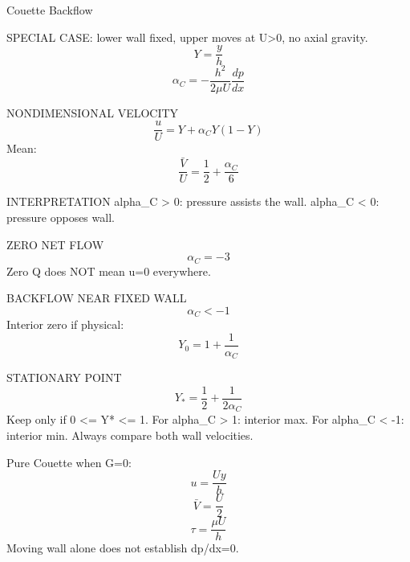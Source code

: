 Couette Backflow

SPECIAL CASE: lower wall fixed, upper moves at U>0, no axial gravity.
$$Y=\frac{y}{h}$$
$$\alpha_C=-\frac{h^2}{2\mu U}\frac{dp}{dx}$$

NONDIMENSIONAL VELOCITY
$$\frac{u}{U}=Y+\alpha_CY(1-Y)$$
Mean:
$$\frac{\bar V}{U}=\frac{1}{2}+\frac{\alpha_C}{6}$$

INTERPRETATION
alpha_C > 0: pressure assists the wall.
alpha_C < 0: pressure opposes wall.

ZERO NET FLOW
$$\alpha_C=-3$$
Zero Q does NOT mean u=0 everywhere.

BACKFLOW NEAR FIXED WALL
$$\alpha_C<-1$$
Interior zero if physical:
$$Y_0=1+\frac{1}{\alpha_C}$$

STATIONARY POINT
$$Y_*=\frac{1}{2}+\frac{1}{2\alpha_C}$$
Keep only if 0 <= Y* <= 1.
For alpha_C > 1: interior max.
For alpha_C < -1: interior min.
Always compare both wall velocities.

Pure Couette when G=0:
$$u=\frac{Uy}{h}$$
$$\bar V=\frac{U}{2}$$
$$\tau=\frac{\mu U}{h}$$
Moving wall alone does not establish dp/dx=0.
